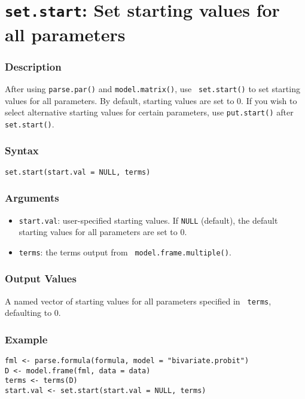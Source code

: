 \section{{\tt set.start}: Set starting values for all parameters}
\label{set.start}

\subsubsection{Description}

After using {\tt parse.par()} and {\tt model.matrix()}, use {\tt
set.start()} to set starting values for all parameters.  By default,
starting values are set to 0.  If you wish to select alternative
starting values for certain parameters, use {\tt put.start()} after
{\tt set.start()}.

\subsubsection{Syntax}
\begin{verbatim}
set.start(start.val = NULL, terms)
\end{verbatim}

\subsubsection{Arguments}

\begin{itemize}
\item {\tt start.val}: user-specified starting values.  If {\tt NULL}
(default), the default starting values for all parameters are set to
0.  
\item {\tt terms}: the terms output from {\tt
model.frame.multiple()}.  
\end{itemize}

\subsubsection{Output Values}
A named vector of starting values for all parameters specified in {\tt
terms}, defaulting to 0.  

\subsubsection{Example}
\begin{verbatim}
fml <- parse.formula(formula, model = "bivariate.probit")
D <- model.frame(fml, data = data)
terms <- terms(D)
start.val <- set.start(start.val = NULL, terms)
\end{verbatim}

